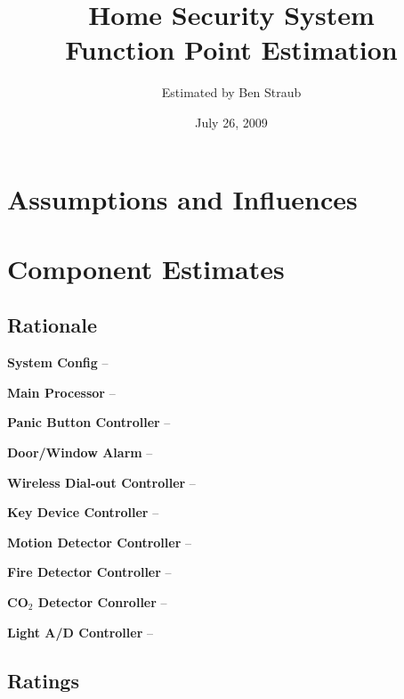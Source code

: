 \documentclass[11pt]{article}
\begin{document}
\title{Home Security System\\Function Point Estimation}
\author{Estimated by Ben Straub}
\date{July 26, 2009}
\maketitle




\section{Assumptions and Influences}

\section{Component Estimates}

\subsection{Rationale}

\textbf{System Config} --

\textbf{Main Processor} --

\textbf{Panic Button Controller} --

\textbf{Door/Window Alarm} --

\textbf{Wireless Dial-out Controller} --

\textbf{Key Device Controller} --

\textbf{Motion Detector Controller} --

\textbf{Fire Detector Controller} --

\textbf{CO$_2$ Detector Conroller} --

\textbf{Light A/D Controller} -- 

\subsection{Ratings}
\end{document}
